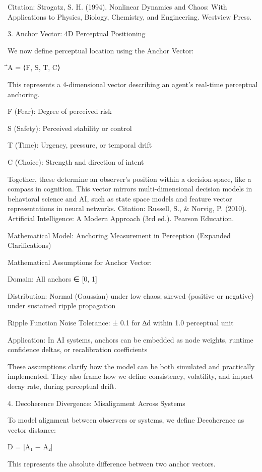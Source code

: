 \documentclass[11pt]{article}
\begin{document}
Citation: Strogatz, S. H. (1994). Nonlinear Dynamics and Chaos: With Applications to Physics, Biology, Chemistry, and Engineering. Westview Press.

3. Anchor Vector: 4D Perceptual Positioning

We now define perceptual location using the Anchor Vector:

⃗A = ⟨F, S, T, C⟩

This represents a 4-dimensional vector describing an agent’s real-time perceptual anchoring.

F (Fear): Degree of perceived risk

S (Safety): Perceived stability or control

T (Time): Urgency, pressure, or temporal drift

C (Choice): Strength and direction of intent

Together, these determine an observer’s position within a decision-space, like a compass in cognition. This vector mirrors multi-dimensional decision models in behavioral science and AI, such as state space models and feature vector representations in neural networks. Citation: Russell, S., & Norvig, P. (2010). Artificial Intelligence: A Modern Approach (3rd ed.). Pearson Education.

Mathematical Model: Anchoring Measurement in Perception (Expanded Clarifications)

Mathematical Assumptions for Anchor Vector:

Domain: All anchors ∈ [0, 1]

Distribution: Normal (Gaussian) under low chaos; skewed (positive or negative) under sustained ripple propagation

Ripple Function Noise Tolerance: ± 0.1 for ∆d within 1.0 perceptual unit

Application: In AI systems, anchors can be embedded as node weights, runtime confidence deltas, or recalibration coefficients

These assumptions clarify how the model can be both simulated and practically implemented. They also frame how we define consistency, volatility, and impact decay rate, during perceptual drift.

4. Decoherence Divergence: Misalignment Across Systems

To model alignment between observers or systems, we define Decoherence as vector distance:

D = |⃗A₁ − ⃗A₂|

This represents the absolute difference between two anchor vectors.
\end{document}
